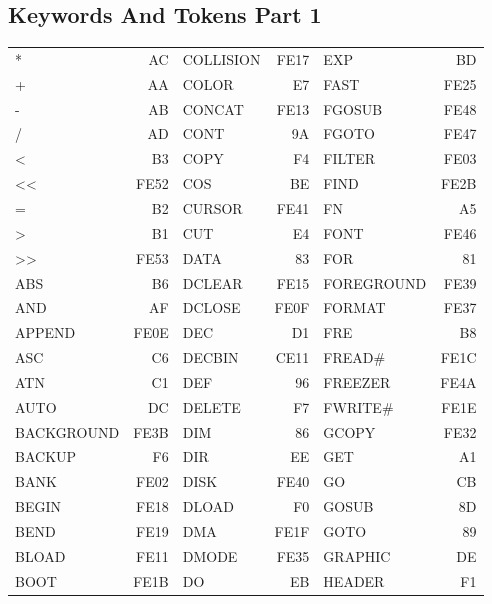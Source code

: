 \subsection{Keywords And Tokens Part 1}
{\ttfamily
\setlength{\tabcolsep}{1mm}
\begin{center}
\begin{tabular}{|p{2.2cm}r|p{2.2cm}r|p{2.2cm}r|}
\hline
*          &   AC & COLLISION  & FE17 & EXP        &   BD \\
+          &   AA & COLOR      &   E7 & FAST       & FE25 \\
-          &   AB & CONCAT     & FE13 & FGOSUB     & FE48 \\
/          &   AD & CONT       &   9A & FGOTO      & FE47 \\
<          &   B3 & COPY       &   F4 & FILTER     & FE03 \\
<<         & FE52 & COS        &   BE & FIND       & FE2B \\
=          &   B2 & CURSOR     & FE41 & FN         &   A5 \\
>          &   B1 & CUT        &   E4 & FONT       & FE46 \\
>>         & FE53 & DATA       &   83 & FOR        &   81 \\
ABS        &   B6 & DCLEAR     & FE15 & FOREGROUND & FE39 \\
AND        &   AF & DCLOSE     & FE0F & FORMAT     & FE37 \\
APPEND     & FE0E & DEC        &   D1 & FRE        &   B8 \\
ASC        &   C6 & DECBIN     & CE11 & FREAD\#    & FE1C \\
ATN        &   C1 & DEF        &   96 & FREEZER    & FE4A \\
AUTO       &   DC & DELETE     &   F7 & FWRITE\#   & FE1E \\
BACKGROUND & FE3B & DIM        &   86 & GCOPY      & FE32 \\
BACKUP     &   F6 & DIR        &   EE & GET        &   A1 \\
BANK       & FE02 & DISK       & FE40 & GO         &   CB \\
BEGIN      & FE18 & DLOAD      &   F0 & GOSUB      &   8D \\
BEND       & FE19 & DMA        & FE1F & GOTO       &   89 \\
BLOAD      & FE11 & DMODE      & FE35 & GRAPHIC    &   DE \\
BOOT       & FE1B & DO         &   EB & HEADER     &   F1 \\

\end{tabular}
\end{center}}
